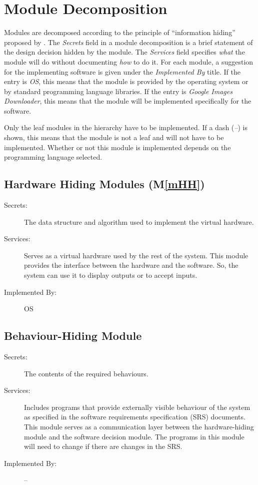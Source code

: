 \documentclass[12pt, titlepage]{article}
\newcommand{\mref}[1]{M\ref{#1}}
\begin{document}
\newpage

\section{Module Decomposition} \label{SecMD}

Modules are decomposed according to the principle of ``information hiding''
proposed by \citet{ParnasEtAl1984}. The \emph{Secrets} field in a module
decomposition is a brief statement of the design decision hidden by the
module. The \emph{Services} field specifies \emph{what} the module will do
without documenting \emph{how} to do it. For each module, a suggestion for the
implementing software is given under the \emph{Implemented By} title. If the
entry is \emph{OS}, this means that the module is provided by the operating
system or by standard programming language libraries.  If the entry is 
\emph{Google Images Downloader}, this means that the module will be implemented 
specifically for the software.

Only the leaf modules in the
hierarchy have to be implemented. If a dash (\emph{--}) is shown, this means
that the module is not a leaf and will not have to be implemented. Whether or
not this module is implemented depends on the programming language
selected.

\subsection{Hardware Hiding Modules (\mref{mHH})}

\begin{description}
\item[Secrets:]The data structure and algorithm used to implement the virtual
  hardware.
\item[Services:]Serves as a virtual hardware used by the rest of the
  system. This module provides the interface between the hardware and the
  software. So, the system can use it to display outputs or to accept inputs.
\item[Implemented By:] OS
\end{description}

\subsection{Behaviour-Hiding Module}

\begin{description}
\item[Secrets:]The contents of the required behaviours.
\item[Services:]Includes programs that provide externally visible behaviour of
  the system as specified in the software requirements specification (SRS)
  documents. This module serves as a communication layer between the
  hardware-hiding module and the software decision module. The programs in this
  module will need to change if there are changes in the SRS.
\item[Implemented By:] --
\end{description}
\end{document}
